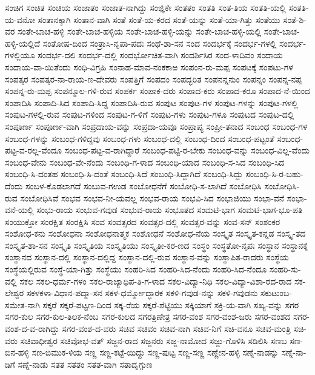 {ಸಂಚಿಗ
ಸಂಚಿತ
ಸಂಚಿಯ
ಸಂಜಾತಂ
ಸಂಜಾತ-ನಾಗಿದ್ದು
ಸಂಜ್ಞಿಕೇ
ಸಂತತಂ
ಸಂತತಿ
ಸಂತ-ತಿಯ
ಸಂತತಿ-ಯಲ್ಲಿ
ಸಂತತಿ-ಯ-ವನೋ
ಸಂತಾನಕ್ಕಾಗಿ
ಸಂತಾನ-ವಾಗಿ
ಸಂತೆ
ಸಂತೆ-ಯ-ಕರದ
ಸಂತೆ-ಯನ್ನು
ಸಂತೆ-ಯಾ-ಗಿತ್ತು
ಸಂತೆಯು
ಸಂತೆ-ಶಿ-ವರ
ಸಂತೇ-ಬಾಚ-ಹಳ್ಳಿ
ಸಂತೇ-ಬಾಚ-ಹಳ್ಳಿಯ
ಸಂತೇ-ಬಾಚ-ಹಳ್ಳಿ-ಯನ್ನು
ಸಂತೇ-ಬಾಚ-ಹಳ್ಳಿ-ಯಲ್ಲಿ
ಸಂತೇ-ಬಾಚ-ಹಳ್ಳಿ-ಯಲ್ಲಿದೆ
ಸಂತೋಷ-ದಿಂದ
ಸಂತ್ರಾಸಿ-ನೃಪಾ-ಪದಃ
ಸಂಥೆ-ಶಾ-ಸನ
ಸಂದ
ಸಂದರ್ಭಕ್ಕೆ
ಸಂದರ್ಭ-ಗಳಲ್ಲಿ
ಸಂದರ್ಭ-ಗಳಲ್ಲಿಯೂ
ಸಂದರ್ಭ-ದಲಿ
ಸಂದರ್ಭ-ದಲ್ಲಿ
ಸಂದರ್ಭೋಚಿತ-ವಾಗಿ
ಸಂದರ್ಶಿಸಿರ
ಸಂದ-ಳಾದಿವಂ
ಸಂದಾಯ
ಸಂದಾಯ-ವಾ-ಯಿತೆಂದು
ಸಂಧಿ-ವಿಗ್ರಹಿ
ಸಂನಾಹ-ಮಾವ-ನಂಕಕಾಱ
ಸಂಪಂನ-ರು-ಮಪ್ಪ
ಸಂಪಟಕ್ಕೆ
ಸಂಪಟು-ಗಳ
ಸಂಪತ್ಕರ
ಸಂಪತ್ಕರ-ನಾ-ರಾಯ-ಣ-ದೇವರು
ಸಂಪತ್ತಿಗೆ
ಸಂಪದಂ
ಸಂಪದ್ಭರಿತ
ಸಂಪನನ್ನನುಂ
ಸಂಪನ್ನಂ
ಸಂಪನ್ನ-ನಪ್ಪ
ಸಂಪನ್ನ-ರು-ಮಪ್ಪ
ಸಂಪನ್ಮೂಲ-ಗಳಿ-ರುವ
ಸಂಪರ್ಕ
ಸಂಪಾಕ-ದರು
ಸಂಪಾದ-ಕರು
ಸಂಪಾದ-ಕರೂ
ಸಂಪಾದ-ನೆ-ಯಿಂದ
ಸಂಪಾದಿಸಿ
ಸಂಪಾದಿ-ಸಿದ
ಸಂಪಾದಿ-ಸಿದ್ದ
ಸಂಪಾದಿಸಿ-ರುವ
ಸಂಪುಟ
ಸಂಪುಟ-ಗಳ
ಸಂಪುಟ-ಗಳನ್ನು
ಸಂಪುಟ-ಗಳಲ್ಲಿ
ಸಂಪುಟ-ಗಳಲ್ಲಿ-ರುವ
ಸಂಪುಟ-ಗಳಿಂದ
ಸಂಪುಟ-ಗ-ಳಿಗೆ
ಸಂಪುಟ-ಗಳು
ಸಂಪುಟ-ಗಳೂ
ಸಂಪುಟದ
ಸಂಪುಟ-ದಲ್ಲಿ
ಸಂಪೂರ್ಣ
ಸಂಪೂರ್ಣ-ವಾಗಿ
ಸಂಪ್ರದಾಯ-ವನ್ನು
ಸಂಪ್ರದಾ-ಯವೂ
ಸಂಪ್ರಾಪ್ಯ
ಸಂಪ್ರೀ-ತನಾದ
ಸಂಬಂಧ
ಸಂಬಂಧ-ಗಳ
ಸಂಬಂಧ-ಗಳನ್ನು
ಸಂಬಂಧ-ಗಳಿದ್ದವು
ಸಂಬಂಧ-ಗಳು
ಸಂಬಂಧ-ದಲ್ಲಿ
ಸಂಬಂಧ-ದಿಂದ
ಸಂಬಂಧ-ಪಟ್ಟಂತೆ
ಸಂಬಂಧ-ಪಟ್ಟ-ವ-ರಲ್ಲ-ವೆಂದೂ
ಸಂಬಂಧ-ಪಟ್ಟ-ವ-ರಾಗಿದ್ದಾರೆ
ಸಂಬಂಧ-ಪಟ್ಟಿ-ರ-ಬೇಕು
ಸಂಬಂಧ-ವನ್ನು
ಸಂಬಂಧ-ವಿಲ್ಲ-ವೆಂದು
ಸಂಬಂಧ-ವೇನು
ಸಂಬಂಧ-ವೇ-ನೆಂದು
ಸಂಬಂಧಿ-ಗ-ಳಾದ
ಸಂಬಂಧಿ-ಯಾದ
ಸಂಬಂಧಿ-ಸ-ಸಿದ
ಸಂಬಂಧಿ-ಸಿದ
ಸಂಬಂಧಿ-ಸಿ-ದಂತಹ
ಸಂಬಂಧಿ-ಸಿ-ದಂತೆ
ಸಂಬಂಧಿ-ಸಿದೆ
ಸಂಬಂಧಿ-ಸಿದ್ದಾಗಿದೆ
ಸಂಬಂಧಿ-ಸಿದ್ದು
ಸಂಬಂಧಿ-ಸಿ-ರ-ಬಹು-ದೆಂದು
ಸಂಬಳ-ಕೊಡಲಾಗದೆ
ಸಂಬುವ-ಗಉಡ
ಸಂಬೋಧನೆಗೆ
ಸಂಬೋಧಿ-ಸ-ಲಾಗಿದೆ
ಸಂಬೋಧಿಸಿ
ಸಂಬೋಧಿಸಿ-ರುವ
ಸಂಬೋಧಿಸಿವೆ
ಸಂಭವ
ಸಂಭವ-ನೀ-ಯವಲ್ಲ
ಸಂಭವ-ರಾಯ
ಸಂಭವಿ-ಸಿದ
ಸಂಭಾಜಿಯು
ಸಂಭಾ-ವನೆ
ಸಂಭಾ-ವನೆ-ಯಲ್ಲಿ
ಸಂಭು-ರಾಯ
ಸಂಭುವ-ಗವುಡ
ಸಂಭುವ-ರಾಯ
ಸಂಭೂತದ
ಸಂಮಟಿ-ಭಾಗ
ಸಂಮಟಿ-ಭಾಗ-ಭೂ-ಪತಿ
ಸಂಯುಕ್ತೋ
ಸಂರಕ್ಷಿತ
ಸಂರಕ್ಷಿಸಿ
ಸಂವ
ಸಂವತ್ಸರದ
ಸಂವತ್ಸರ-ದಲ್ಲಿ
ಸಂವತ್ಸರ-ವನ್ನು
ಸಂವ-ಸನ್
ಸಂಶಂಕರ
ಸಂಶೋಧ-ಕನು
ಸಂಶೋಧನಾ
ಸಂಶೋಧನಾತ್ಮಕ
ಸಂಶೋಧನೆ
ಸಂಶೋಧ-ನೆಯ
ಸಂಸ್ಕೃತ
ಸಂಸ್ಕೃತ-ಕನ್ನಡ
ಸಂಸ್ಕೃ-ತದ
ಸಂಸ್ಕೃತ-ಶಾ-ಸನ
ಸಂಸ್ಕೃತಿ
ಸಂಸ್ಕೃತಿಯ
ಸಂಸ್ಕೃತಿಯು
ಸಂಸ್ಕೃತೀ-ಕರ-ಣದ
ಸಂಸ್ಥಂ
ಸಂಸ್ಥತೋ-ನೃಪಃ
ಸಂಸ್ಥಾನ
ಸಂಸ್ಥಾನಕ್ಕೆ
ಸಂಸ್ಥಾನದ
ಸಂಸ್ಥಾನ-ದಲ್ಲಿ
ಸಂಸ್ಥಾನ-ದಲ್ಲಿದ್ದ
ಸಂಸ್ಥಾನ-ದಲ್ಲಿ-ರುವ
ಸಂಸ್ಥಾನ-ವನ್ನು
ಸಂಸ್ಥಾಪಿತ-ರಾದರು
ಸಂಸ್ಥೆಯ
ಸಂಸ್ಥೆಯಲ್ಲಿರುವ
ಸಂಸ್ಥೆ-ಯಾ-ಗಿತ್ತು
ಸಂಸ್ಥೆಯು
ಸಂಹರಿ-ಸಿದ
ಸಂಹರಿ-ಸಿದ-ನೆಂದು
ಸಂಹರಿ-ಸಿದ-ನೆಂದೂ
ಸಂಹರಿ-ಸು-ವಲ್ಲಿ
ಸಕಲ
ಸಕಲ-ಧರ್ಮ-ಗಳಂ
ಸಕಲ-ರಾಜ್ಯಾಧಿಪ-ತಿ-ಗ-ಳಾದ
ಸಕಲ-ವಿದ್ಯಾ-ನಿಧಿ
ಸಕಲ-ವಿದ್ಯಾ-ವಿಶಾ-ರದ-ರಾದ
ಸಕ-ಲೇಶ್ವರ
ಸಕಳಕಳಾ-ವಿಧಾನ-ಪದ್ಮಾ-ಸನ
ಸಕಳ-ಧರ್ಮ್ಮೋದ್ಧಾರಕ
ಸಕಳಿ-ಗವುಡ-ನನ್ನು
ಸಕಳಿ-ಗವುಡನು
ಸಕುಟುಂಬ-ಸಮೇತ-ನಾಗಿ
ಸಕ್ಕರೆ
ಸಕ್ಕರೆ-ಪಟ್ಟಣ-ದಿಂದ
ಸಕ್ಕ-ರೆಯ
ಸಕ್ಕರೆ-ಶೆಟ್ಟಿಯು
ಸಕ್ಕಿಯಾಗೆ
ಸಕ್ರಿ-ಯ-ವಾಗಿ
ಸಖ್ಯ-ವನ್ನು
ಸಗರ
ಸಗರ-ಕುಲ
ಸಗರ-ಕುಲ-ತಿಲಕ-ನೆಂಬ
ಸಗರ-ಕುಲದ
ಸಗರತ್ರಿಣೇತ್ರ
ಸಗರ-ವಂಶ
ಸಗರ-ವಂಶ-ಜರು
ಸಗರ-ವಂಶದ
ಸಗರ-ವಂಶ-ದ-ವ-ರಾಗಿದ್ದು
ಸಗರ-ವಂಶ-ದ-ವರು
ಸಚಿವ
ಸಚಿವಂ
ಸಚಿವ-ನಾಗಿ
ಸಚಿವ-ನಿಗೆ
ಸಚಿ-ವನೂ
ಸಚಿವ-ಮಂತ್ರಿ
ಸಚಿ-ವರು
ಸಚಿವಾಧೀಶ್ವರ
ಸಚಿವೋಭ-ವತ್
ಸಜ್ಜನ-ರಾದ
ಸಜ್ಜನರು
ಸಜ್ಜ-ನಾಮೋದ
ಸಜ್ಜು-ಗೊಳಿಸಿ
ಸಡಿಲಿಸಿ
ಸಣಬ
ಸಣ-ಬಿನ-ಹಳ್ಳಿ
ಸಣ-ಬಿಮುಕ-ಳಿಯ
ಸಣ್ಣ
ಸಣ್ಣ-ಕಟ್ಟೆ-ಯಿದ್ದು
ಸಣ್ಣ-ಪುಟ್ಟ
ಸಣ್ಣ-ಸಣ್ಣ
ಸಣ್ಣೇನ-ಹಳ್ಳಿ
ಸಣ್ನೆ-ನಾಡನ್ನು
ಸಣ್ನೆ-ನಾ-ಡಿಗೆ
ಸಣ್ನೆ-ನಾಡು
ಸತತ
ಸತತಂ
ಸತತ-ವಾಗಿ
ಸತಾದೃಗ್ಗುಣ
}
